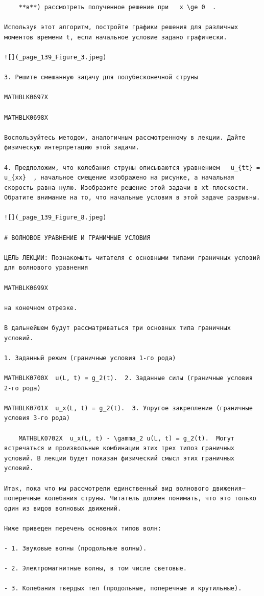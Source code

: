 \documentclass[
]{article}
\begin{document}
\begin{verbatim}
    **в**) рассмотреть полученное решение при   x \ge 0  .

Используя этот алгоритм, постройте графики решения для различных моментов времени t, если начальное условие задано графически.

![](_page_139_Figure_3.jpeg)

3. Решите смешанную задачу для полубесконечной струны

MATHBLK0697X

MATHBLK0698X

Воспользуйтесь методом, аналогичным рассмотренному в лекции. Дайте физическую интерпретацию этой задачи.

4. Предположим, что колебания струны описываются уравнением   u_{tt} = u_{xx}  , начальное смещение изображено на рисунке, а начальная скорость равна нулю. Изобразите решение этой задачи в xt-плоскости. Обратите внимание на то, что начальные условия в этой задаче разрывны.

![](_page_139_Figure_8.jpeg)

# ВОЛНОВОЕ УРАВНЕНИЕ И ГРАНИЧНЫЕ УСЛОВИЯ

ЦЕЛЬ ЛЕКЦИИ: Познакомыть читателя с основными типами граничных условий для волнового уравнения

MATHBLK0699X

на конечном отрезке.

В дальнейшем будут рассматриваться три основных типа граничных условий.

1. Заданный режим (граничные условия 1-го рода)

MATHBLK0700X  u(L, t) = g_2(t).  2. Заданные силы (граничные условия 2-го рода)

MATHBLK0701X  u_x(L, t) = g_2(t).  3. Упругое закрепление (граничные условия 3-го рода)

    MATHBLK0702X  u_x(L, t) - \gamma_2 u(L, t) = g_2(t).  Могут встречаться и произвольные комбинации этих трех типоз граничных условий. В лекции будет показан физический смысл этих граничных условий.

Итак, пока что мы рассмотрели единственный вид волнового движения—поперечные колебания струны. Читатель должен понимать, что это только один из видов волновых движений.

Ниже приведен перечень основных типов волн:

- 1. Звуковые волны (продольные волны).

- 2. Электромагнитные волны, в том числе световые.

- 3. Колебания твердых тел (продольные, поперечные и крутильные).


\end{verbatim}
\end{document}
